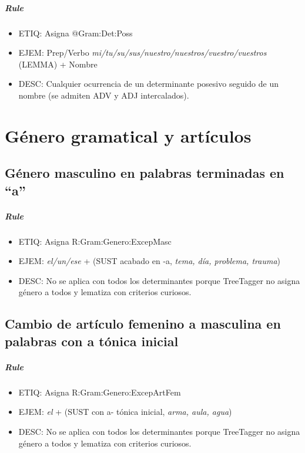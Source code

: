 \documentclass[11pt]{report}
\begin{document}
\paragraph*{Rule}
\begin{itemize}
\item ETIQ: Asigna @Gram:Det:Poss
\item EJEM: Prep/Verbo \emph{mi/tu/su/sus/nuestro/nuestros/vuestro/vuestros} (LEMMA) + Nombre
\item DESC: Cualquier ocurrencia de un determinante posesivo seguido de un nombre (se admiten ADV y ADJ intercalados).
\end{itemize}

\chapter{Género gramatical y artículos}
\section{Género masculino en palabras terminadas en ``a''}
\paragraph*{Rule}
\begin{itemize}
\item ETIQ: Asigna R:Gram:Genero:ExcepMasc
\item EJEM: \emph{el/un/ese} + (SUST acabado en -a, \emph{tema, día, problema, trauma})
\item DESC: No se aplica con todos los determinantes porque TreeTagger no asigna género a todos y lematiza con criterios curiosos.
\end{itemize}

\section{Cambio de artículo femenino a masculina en palabras con a tónica inicial}
\paragraph*{Rule}
\begin{itemize}
\item ETIQ: Asigna R:Gram:Genero:ExcepArtFem
\item EJEM: \emph{el} + (SUST con a- tónica inicial, \emph{arma, aula, agua})
\item DESC: No se aplica con todos los determinantes porque TreeTagger no asigna género a todos y lematiza con criterios curiosos.
\end{itemize}
\end{document}
